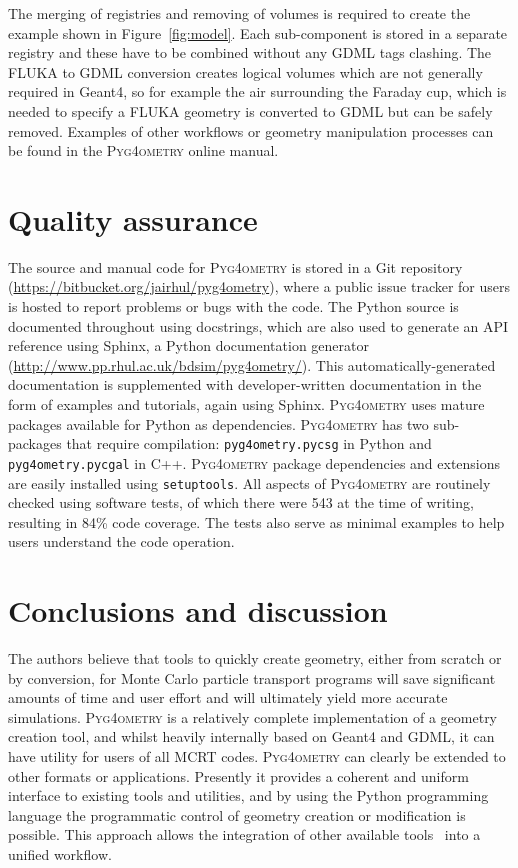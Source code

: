 \documentclass[preprint,12pt]{elsarticle}
\newcommand{\pyinline}[1]{\lstinline[postbreak={}]{#1}}
\newcommand{\PYGEOMETRY}{\textsc{Pyg4ometry}}
\begin{document}
The merging of registries and removing of volumes is required to create the example shown in Figure~\ref{fig:model}.
Each sub-component is stored in a separate registry and these have to be combined without any GDML tags clashing.
The FLUKA to GDML conversion creates logical volumes which are not generally required in Geant4, so for example
the air surrounding the Faraday cup, which is needed to specify a FLUKA geometry is converted to GDML but can be
safely removed. Examples of other workflows or geometry manipulation processes can be found in
the \PYGEOMETRY{} online manual.

\section{Quality assurance}
The source and manual code for \PYGEOMETRY{} is stored in a Git repository (\url{https://bitbucket.org/jairhul/pyg4ometry}),
where a public issue tracker for users is hosted to report problems or bugs
with the code. The Python source is documented throughout using docstrings, which
are also used to generate an API reference using Sphinx, a
Python documentation generator
(\url{http://www.pp.rhul.ac.uk/bdsim/pyg4ometry/}).  This
automatically-generated documentation is supplemented with
developer-written documentation in the form of examples and tutorials,
again using Sphinx. \PYGEOMETRY{} uses mature packages
available for Python as dependencies. \PYGEOMETRY{} has  two sub-packages
that require compilation: \pyinline{pyg4ometry.pycsg} in Python and
\pyinline{pyg4ometry.pycgal} in C++.
\PYGEOMETRY{} package dependencies and extensions are easily installed using
\pyinline{setuptools}. All aspects of \PYGEOMETRY{} are routinely checked
using software tests, of which there were 543 at the time of writing,
resulting in 84\% code coverage. The tests also serve as minimal examples to help users understand the code operation.

\section{Conclusions and discussion}
The authors believe that tools to quickly create geometry, either from scratch or by conversion,
for Monte Carlo particle transport programs
will save significant amounts of time and user effort and will ultimately
yield more accurate simulations. \PYGEOMETRY{} is a relatively complete implementation of a geometry
creation tool, and whilst heavily internally based on Geant4 and GDML, it can have utility for users of all MCRT
codes. \PYGEOMETRY{} can clearly be extended to other formats or applications. Presently it provides a coherent and
uniform interface to existing tools and utilities, and by using the Python programming language
 the programmatic control of geometry creation or modification is possible. This approach allows the integration of
other available tools~\cite{DavisNIMA915-65} into a unified workflow.
\end{document}
